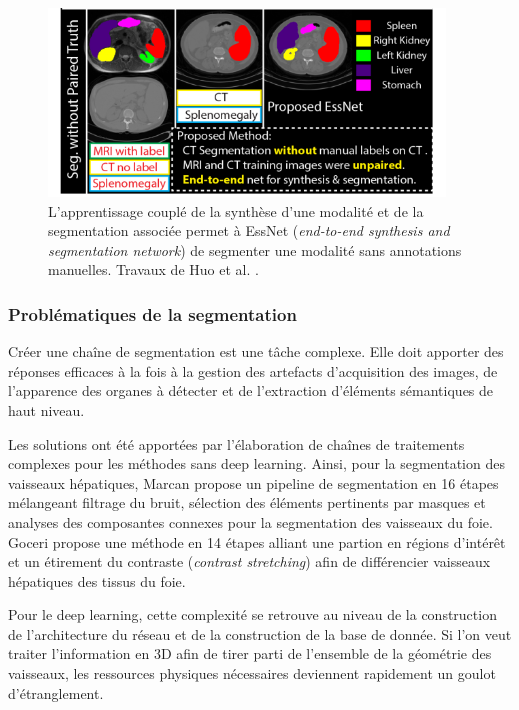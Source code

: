       \begin{figure}[!ht]
        \centering
        \includegraphics[height=5cm]{Images/ESSNET_application.png}
        \caption{L'apprentissage couplé de la synthèse d'une modalité et de la segmentation associée permet à EssNet (\textit{end-to-end synthesis and segmentation network}) de segmenter une modalité sans annotations manuelles. Travaux de Huo et al. \cite{Huo2018_adversarial}. }
        \label{fig:ESSNet}
      \end{figure}

    \subsubsection{Problématiques de la segmentation}

    Créer une chaîne de segmentation est une tâche complexe. Elle doit apporter des réponses efficaces à la fois à la gestion des artefacts d'acquisition des images, de l'apparence des organes à détecter et de l'extraction d'éléments sémantiques de haut niveau. 

    Les solutions ont été apportées par l'élaboration de chaînes de traitements complexes pour les méthodes sans deep learning. Ainsi, pour la segmentation des vaisseaux hépatiques, Marcan \cite{Marcan2014_vessel_seg} propose un pipeline de segmentation en 16 étapes mélangeant filtrage du bruit, sélection des éléments pertinents par masques et analyses des composantes connexes pour la segmentation des vaisseaux du foie. Goceri \cite{Goceri2017_vessel} propose une méthode en 14 étapes alliant une partion en régions d'intérêt et un étirement du contraste (\textit{contrast stretching}) afin de différencier vaisseaux hépatiques des tissus du foie.
  
    Pour le deep learning, cette complexité se retrouve au niveau de la construction de l'architecture du réseau et de la construction de la base de donnée. Si l'on veut traiter l'information en 3D afin de tirer parti de l'ensemble de la géométrie des vaisseaux, les ressources physiques nécessaires deviennent rapidement un goulot d'étranglement.  
    
